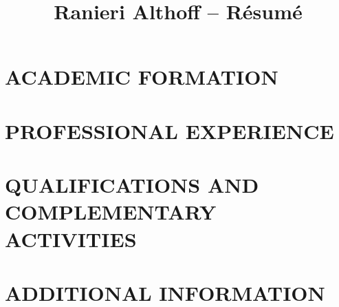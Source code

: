 \documentclass[10pt]{article}
\newcommand{\sectiontitle}[1]{\section*{\uppercase{#1}}}
\begin{document}
\title{Ranieri Althoff -- Résumé}

\sectiontitle{Academic Formation}


\sectiontitle{Professional Experience}


\sectiontitle{Qualifications and Complementary Activities}


\sectiontitle{Additional Information}
\end{document}
